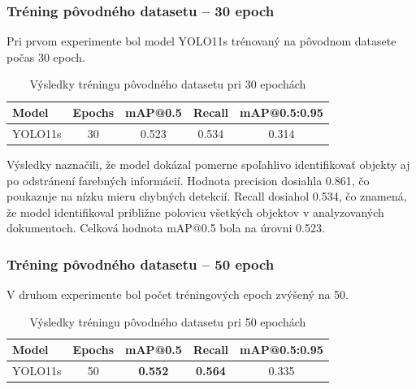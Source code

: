         \subsubsection{Tréning pôvodného datasetu – 30 epoch}
            Pri prvom experimente bol model YOLO11s trénovaný na pôvodnom datasete počas 30 epoch.
            
            \begin{table}[H]
            \centering
                \begin{tabular}{|l|c|c|c|c|}
                \hline
                \textbf{Model} & \textbf{Epochs} & \textbf{mAP@0.5} & \textbf{Recall} & \textbf{mAP@0.5:0.95} \\ \hline
                YOLO11s & 30 & 0.523 & 0.534 & 0.314 \\ \hline
                \end{tabular}
                \caption{Výsledky tréningu pôvodného datasetu pri 30 epochách}
                \label{tab:default30}
            \end{table}
            Výsledky naznačili, že model dokázal pomerne spoľahlivo identifikovať objekty aj po odstránení farebných informácií. Hodnota precision dosiahla 0.861, čo poukazuje na nízku mieru chybných detekcií. Recall dosiahol 0.534, čo znamená, že model identifikoval približne polovicu všetkých objektov v analyzovaných dokumentoch. Celková hodnota mAP@0.5 bola na úrovni 0.523.

        \subsubsection{Tréning pôvodného datasetu – 50 epoch}

            V druhom experimente bol počet tréningových epoch zvýšený na 50.

            \begin{table}[H]
                \centering
                \begin{tabular}{|l|c|c|c|c|}
                \hline
                \textbf{Model} & \textbf{Epochs} & \textbf{mAP@0.5} & \textbf{Recall} & \textbf{mAP@0.5:0.95} \\ \hline
                YOLO11s & 50 & \textbf{0.552} & \textbf{0.564} & 0.335 \\ \hline
                \end{tabular}
                \caption{Výsledky tréningu pôvodného datasetu pri 50 epochách}
                \label{tab:default50}
            \end{table}

